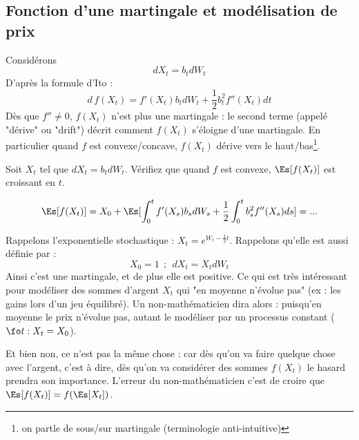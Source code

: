 \documentclass{article}
\begin{document}






\subsection{Fonction d'une martingale et  modélisation de prix}

Considérons 
$$
dX_t=  b_t dW_t
$$
D'après la formule d'Ito : 
$$
d\, f(X_t) =  f'(X_t) b_t dW_t + \frac 12 b_t^2 f''(X_t)dt 
$$
Dès que $f''\neq0$,  $f(X_t)$ n'est plus une martingale :  le second terme (appelé "dérive" ou "drift") décrit comment $f(X_t)$  s'éloigne d'une martingale.  En particulier quand $f$ est convexe/concave, $f(X_t)$ dérive vers le haut/bas\footnote{on partle de sous/sur martingale (terminologie anti-intuitive)}. 

\begin{exo} Soit  $X_t$ tel que $dX_t=  b_t dW_t$. Vérifiez que quand $f$ est convexe, $\Es[f(X_t)] $ est croissant en $t$. 

\begin{cor}
$$
\Es[f(X_t)] = X_0 + \Es[\int_0^t  f'(X_s) b_s dW_s + \frac 12 \int_0^t b_s^2 f''(X_s)ds] = ...
$$
\end{cor}

\end{exo}


Rappelons l'exponentielle stochastique : $X_t = e^{W_t-\frac 12 t }$. Rappelons qu'elle est aussi définie par :
$$
X_0=1 \ \ ; \ \ dX_t = X_t dW_t       
$$
Ainsi c'est une martingale, et de plus elle est positive. Ce qui est très intéressant pour modéliser des sommes d'argent $X_t$ qui "en moyenne n'évolue pas" (ex : les gains lors d'un jeu équilibré).  Un non-mathématicien dira alors :  puisqu'en moyenne le prix n'évolue pas, autant le modéliser par un processus constant ($\fo t : X_t=X_0$).  

Et bien non, ce n'est pas la même chose : car dès qu'on va faire quelque chose avec l'argent, c'est à dire, dès qu'on va considérer des sommes $f(X_t)$  le hasard prendra son importance. L'erreur du non-mathématicien c'est de croire que $\Es[f(X_t)] = f (\Es[X_t])$.
\end{document}
